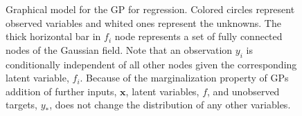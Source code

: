 \begin{figure}
\begin{center}
\begin{tikzpicture}
          \end{tikzpicture}
    \end{center}
    \caption{Graphical model for the GP for regression. Colored circles represent observed variables and whited ones represent the unknowns. The thick horizontal bar in $f_i$ node represents a set of fully connected nodes of the Gaussian field. Note that an observation $y_i$ is conditionally independent of all other nodes given the corresponding latent variable, $f_i$. Because of the marginalization property of GPs addition of further inputs, $\mathbf{x}$, latent variables, $f$, and unobserved targets, $y_*$, does not change the distribution of any other variables.}
\end{figure}